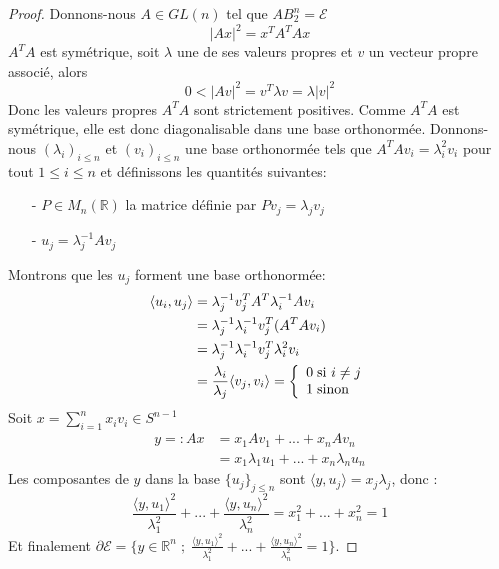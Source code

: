 \documentclass[12pt]{article}
\theoremstyle{definition}
\begin{document}
\begin{proof}
	Donnons-nous $A\in GL(n)$ tel que $AB_2^n=\mathcal{E}$
	\begin{equation*}
	|Ax|^2 = x^T A^TAx 
	\end{equation*}
	$A^T A$ est symétrique, soit $\lambda$ une de ses valeurs propres et $v$ un vecteur propre associé, alors  
	\begin{equation*}
	0< |Av|^2 = v^T \lambda v = \lambda |v|^2
	\end{equation*}
	Donc les valeurs propres $A^TA$ sont strictement positives. Comme $A^TA$ est symétrique, elle est donc diagonalisable dans une base orthonormée. Donnons-nous $(\lambda_i)_{i\leq n}$ et $(v_i)_{i\leq n}$ une base orthonormée tels que $A^TAv_i = \lambda_i^2 v_i$ pour tout $1\leq i\leq n$ et définissons les quantités suivantes:
	\begin{enumerate}
		\item[-] $P\in M_n(\mathbb{R})$ la matrice définie par $Pv_j = \lambda_j v_j$
		\item[-] $u_j=\lambda_j^{-1}Av_j$
	\end{enumerate}
	Montrons que les $u_j$ forment une base orthonormée: 
	\begin{align*}
	\langle u_i,u_j\rangle &= \lambda_j^{-1}v_j^TA^T \lambda_i^{-1}Av_i\\
	&=\lambda_j^{-1}\lambda_i^{-1}v_j^T(A^T Av_i) \\
	&= \lambda_j^{-1}\lambda_i^{-1}v_j^T \lambda_i^2 v_i\\
	&=\frac{\lambda_i}{\lambda_j} \langle v_j,v_i\rangle = \left\{ \begin{array}{ll} 0 \hspace{1mm}\text{si $i\neq j$} \\ 1 \hspace{1mm}\text{sinon} \end{array} \right.
	\end{align*}
	Soit $x = \sum_{i=1}^{n}x_i v_i\in S^{n-1}$  
	\begin{align*}
	y=: Ax&= x_1Av_1+...+x_nAv_n \\ 
	&= x_1 \lambda_1 u_1 + ... + x_n \lambda_n u_n
	\end{align*}
	Les composantes de $y$ dans la base $\{u_j\}_{j\leq n}$ sont $\langle y,u_j\rangle = x_j\lambda_j$, donc :
	\begin{equation*}
	\frac{\langle y,u_1\rangle ^2}{\lambda_1^2}+...+\frac{\langle y,u_n\rangle ^2}{\lambda_n^2} = x_1^2+...+x_n^2 =1
	\end{equation*}
	Et finalement $\partial \mathcal{E} = \big\{y\in\mathbb{R}^n \; ; \; \frac{\langle y,u_1\rangle ^2}{\lambda_1^2}+...+\frac{\langle y,u_n\rangle ^2}{\lambda_n^2} = 1\big\} $.
\end{proof}
\end{document}
